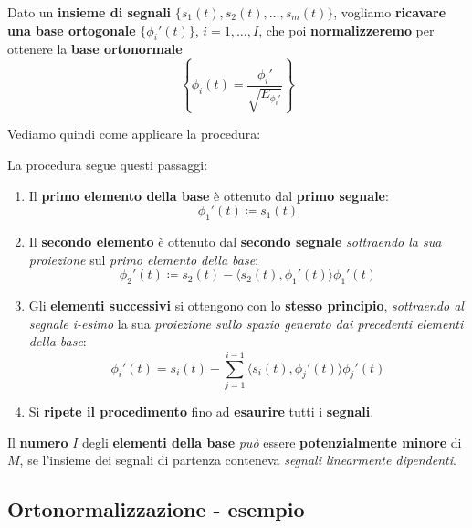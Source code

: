 Dato un \textbf{insieme di segnali} $\{s_1(t),s_{2}(t),\ldots ,s_m(t)\}$, vogliamo 
\textbf{ricavare una base ortogonale} $\{ \phi_i'(t) \}$, $i=1,\ldots ,I$, che 
poi \textbf{normalizzeremo} per ottenere la \textbf{base ortonormale}
\[
    \left\{ \phi_i(t) = \frac{\phi_i'}{\sqrt{E_{\phi_i'}} } \right\}  
\]

Vediamo quindi come applicare la procedura:

\begin{definition}
    La procedura segue questi passaggi:
    \begin{enumerate}
        \item Il \textbf{primo elemento della base} è 
            ottenuto dal \textbf{primo segnale}:
            \[
                \phi_{1}'(t) \coloneqq s_{1}(t)
            \] 
        \item Il \textbf{secondo elemento} è ottenuto dal
            \textbf{secondo segnale} \textit{sottraendo la sua proiezione} sul
            \textit{primo elemento della base}:
            \[
                \phi_{2}'(t) \coloneqq s_{2}(t) - \langle s_{2}(t), \phi_{1}'(t) \rangle \phi_{1}'(t)
            \] 
        \item Gli \textbf{elementi successivi} si ottengono con lo
            \textbf{stesso principio}, \textit{sottraendo al segnale i-esimo}
            la sua \textit{proiezione sullo spazio generato dai precedenti elementi della base}:
            \[
                \phi_i'(t) = s_i(t) - \sum_{j=1}^{i-1} \langle s_i(t), \phi_j'(t) \rangle \phi_j'(t)
            \] 
        \item Si \textbf{ripete il procedimento} fino ad \textbf{esaurire}
            tutti i \textbf{segnali}.
    \end{enumerate}
\end{definition}

\begin{remark}
    Il \textbf{numero} $I$ degli \textbf{elementi della base} \textit{può}
    essere \textbf{potenzialmente minore} di $M$, se l'insieme
    dei segnali di partenza conteneva \textit{segnali linearmente dipendenti}.
\end{remark}

\subsection{Ortonormalizzazione - esempio}


